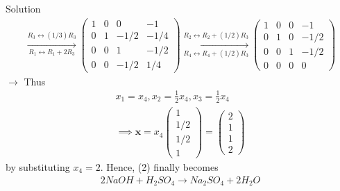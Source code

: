 \documentclass{beamer}
\numberwithin{equation}{section}
\theoremstyle{remark}
\newcommand{\myvec}[1]{\ensuremath{\begin{pmatrix}#1\end{pmatrix}}}
\let\vec\mathbf
\begin{document}
\begin{frame}{Solution}
\begin{align}
\xrightarrow[R_1 \leftrightarrow R_1 + 2R_3]{R_3 \leftrightarrow (1/3)R_3}\myvec{1&0&0&-1\\0&1&-1/2&-1/4\\0&0&1&-1/2\\0&0&-1/2&1/4}\xrightarrow[R_4 \leftrightarrow R_4 + (1/2)R_3]{R_2 \leftrightarrow R_2 + (1/2)R_3}\myvec{1&0&0&-1\\0&1&0&-1/2\\0&0&1&-1/2\\0&0&0&0}
\end{align}
$\rightarrow$ Thus
\begin{align}
    x_1 = x_4, x_2 = \frac{1}{2}x_4, x_3 = \frac{1}{2}x_4 \\
    \implies \vec{x} = x_4\myvec{1\\1/2\\1/2\\1} = \myvec{2\\1\\1\\2}
\end{align}
\hspace{0.3cm} by substituting $x_4 = 2$. Hence, (2) finally becomes
\begin{align}
    2NaOH + H_2SO_4 \rightarrow Na_2SO_4 + 2H_2O
\end{align}
\end{frame}
\end{document}
